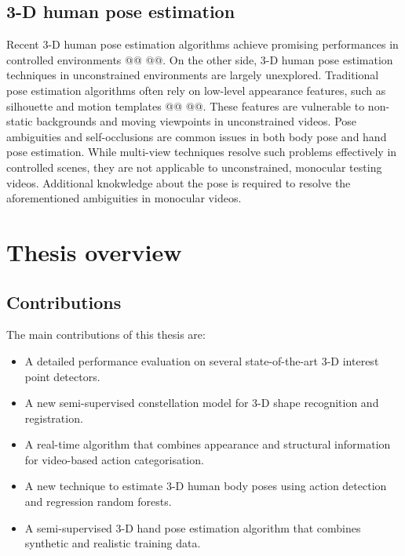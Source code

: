 \subsection{3-D human pose estimation} 


Recent 3-D human pose estimation algorithms achieve promising performances in controlled environments @@ @@. On the other side, 3-D human pose estimation techniques in unconstrained environments are largely unexplored.       
Traditional pose estimation algorithms often rely on low-level appearance features, such as silhouette and motion templates @@ @@. These features are vulnerable to non-static backgrounds and moving viewpoints in unconstrained videos. 
Pose ambiguities and self-occlusions are common issues in both body pose and hand pose estimation. While multi-view techniques resolve such problems effectively in controlled scenes, they are not applicable to unconstrained, monocular testing videos. Additional knokwledge about the pose is required to resolve the aforementioned ambiguities in monocular videos. 

\section{Thesis overview}

\subsection{Contributions}

The main contributions of this thesis are:
\begin{itemize}
	\item A detailed performance evaluation on several state-of-the-art 3-D interest point detectors.
	\item A new semi-supervised constellation model for 3-D shape recognition and registration. 
	\item A real-time algorithm that combines appearance and structural information for video-based action categorisation. 
	\item A new technique to estimate 3-D human body poses using action detection and regression random forests. 
	\item A semi-supervised 3-D hand pose estimation algorithm that combines synthetic and realistic training data. 
\end{itemize}

